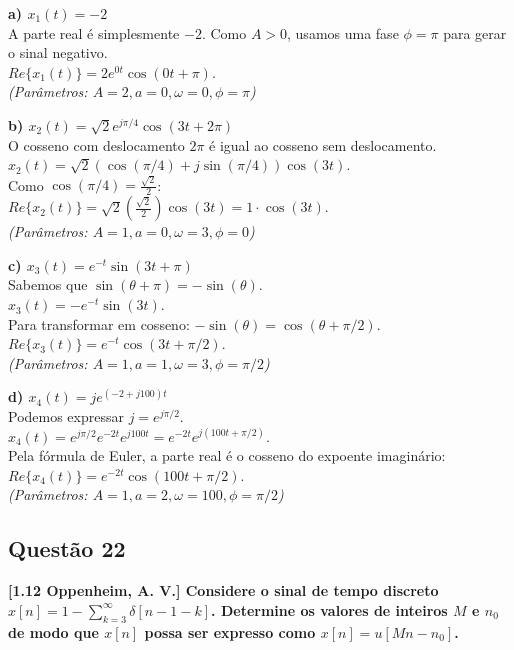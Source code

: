 \textbf{a) \(x_1(t) = -2\)}\\
A parte real é simplesmente \(-2\). Como \(A > 0\), usamos uma fase \(\phi = \pi\) para gerar o sinal negativo.\\
\(Re\{x_1(t)\} = 2 e^{0t} \cos(0t + \pi)\).\\
\emph{(Parâmetros: \(A = 2, a = 0, \omega = 0, \phi = \pi\))}

\textbf{b) \(x_2(t) = \sqrt{2}e^{j\pi/4} \cos(3t + 2\pi)\)}\\
O cosseno com deslocamento \(2\pi\) é igual ao cosseno sem deslocamento.\\
\(x_2(t) = \sqrt{2} (\cos(\pi/4) + j\sin(\pi/4)) \cos(3t)\).\\
Como \(\cos(\pi/4) = \frac{\sqrt{2}}{2}\):\\
\(Re\{x_2(t)\} = \sqrt{2} \left(\frac{\sqrt{2}}{2}\right) \cos(3t) = 1\cdot\cos(3t)\).\\
\emph{(Parâmetros: \(A = 1, a = 0, \omega = 3, \phi = 0\))}

\textbf{c) \(x_3(t) = e^{-t} \sin(3t + \pi)\)}\\
Sabemos que \(\sin(\theta + \pi) = -\sin(\theta)\).\\
\(x_3(t) = -e^{-t}\sin(3t)\).\\
Para transformar em cosseno: \(-\sin(\theta) = \cos(\theta + \pi/2)\).\\
\(Re\{x_3(t)\} = e^{-t} \cos(3t + \pi/2)\).\\
\emph{(Parâmetros: \(A = 1, a = 1, \omega = 3, \phi = \pi/2\))}

\textbf{d) \(x_4(t) = j e^{(-2+j100)t}\)}\\
Podemos expressar \(j = e^{j\pi/2}\).\\
\(x_4(t) = e^{j\pi/2} e^{-2t} e^{j100t} = e^{-2t} e^{j(100t + \pi/2)}\).\\
Pela fórmula de Euler, a parte real é o cosseno do expoente imaginário:\\
\(Re\{x_4(t)\} = e^{-2t} \cos(100t + \pi/2)\).\\
\emph{(Parâmetros: \(A = 1, a = 2, \omega = 100, \phi = \pi/2\))}

\subsection{Questão 22}\label{questuxe3o-22}

\textbf{{[}1.12 Oppenheim, A. V.{]} Considere o sinal de tempo discreto \(x[n] = 1 - \sum_{k=3}^{\infty}\delta[n - 1 - k]\). Determine os valores de inteiros \(M\) e \(n_0\) de modo que \(x[n]\) possa ser expresso como \(x[n] = u[Mn - n_0]\).}

